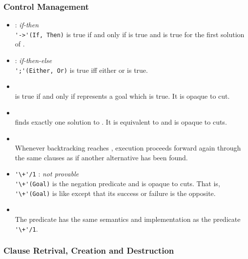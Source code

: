 \subsubsection{Control Management}
\begin{itemize}
%
\item {} : \textit{if-then}\\
\noindent\verb|'->'(If, Then)| is true if and only if  is true
and  is true for the first solution of .
%
\item {} : \textit{if-then-else}\\
\noindent\verb|';'(Either, Or)| is true iff either  or
 is true.
%
\item {}\\
\noindent{} is true if and only if 
represents a goal which is true. It is opaque to cut.\\
%
\item {}\\
\noindent{} finds exactly one solution to .
It is equivalent to  and is opaque to cuts.\\
%
\item {}\\
Whenever backtracking reaches \noindent{}, execution
proceeds forward again through the same clauses as if
another alternative has been found.\\
%
\item \verb|'\+'/1| : \textit{not provable}\\
\noindent\verb|'\+'(Goal)| is the negation predicate and is
opaque to cuts. That is, \verb|'\+'(Goal)| is like
 except that its success or failure is the opposite.\\
%
\item {}\\
\noindent The predicate  has the same semantics and
implementation as the predicate \verb|'\+'/1|.\\
%
\end{itemize}

\subsubsection{Clause Retrival, Creation and Destruction}

